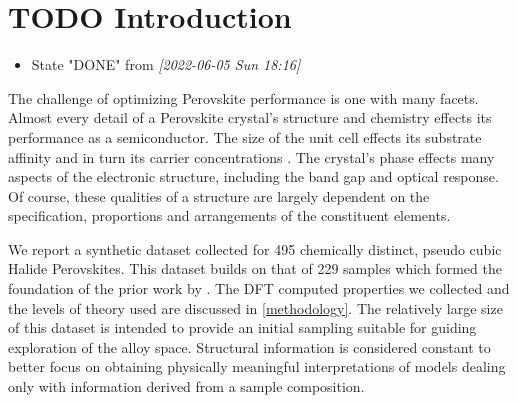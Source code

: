 \documentclass[twoside, twocolumn, 9pt, draft]{article}
\begin{document}
\renewcommand*\rmdefault{bch}\normalfont\upshape
\rmfamily
\section*{}
\vspace{-1cm}



\section*{{\bfseries\sffamily TODO} Introduction}
\label{sec:org608b5a4}
\begin{itemize}
\item State "DONE"       from              \textit{[2022-06-05 Sun 18:16]}
\end{itemize}
The challenge of optimizing Perovskite performance is one with many
facets. Almost every detail of a Perovskite crystal's structure and
chemistry effects its performance as a semiconductor. The size of the
unit cell effects its substrate affinity and in turn its carrier
concentrations \cite{jiang-2006-predic-lattic}. The crystal's phase
effects many aspects of the electronic structure, including the band
gap and optical response. Of course, these qualities of a structure
are largely dependent on the specification, proportions and
arrangements of the constituent elements.

We report a synthetic dataset collected for 495 chemically distinct,
pseudo cubic Halide Perovskites. This dataset builds on that of 229
samples which formed the foundation of the prior work by
\citet{mannodi-kanakkithodi-2021-data-driven-new}. The DFT computed
properties we collected and the levels of theory used are discussed in
\ref{methodology}. The relatively large size of this dataset is intended
to provide an initial sampling suitable for guiding exploration of the
alloy space. Structural information is considered constant to better
focus on obtaining physically meaningful interpretations of models
dealing only with information derived from a sample composition.
\end{document}
